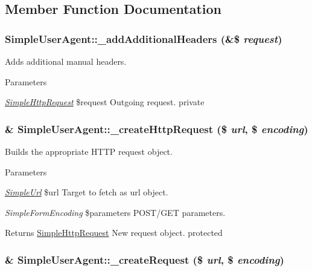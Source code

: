 \subsection{Member Function Documentation}
\hypertarget{class_simple_user_agent_a1ff4d1b6d409818bee5df07bc21c550f}{
\subsubsection[{\_\-addAdditionalHeaders}]{\setlength{\rightskip}{0pt plus 5cm}SimpleUserAgent::\_\-addAdditionalHeaders (\&\$ {\em request})}}
\label{class_simple_user_agent_a1ff4d1b6d409818bee5df07bc21c550f}
Adds additional manual headers. 
\begin{DoxyParams}{Parameters}
\item[{\em \hyperlink{class_simple_http_request}{SimpleHttpRequest}}]\$request Outgoing request.  private \end{DoxyParams}
\hypertarget{class_simple_user_agent_a1232e794f352b5f6b300899992277fb0}{
\subsubsection[{\_\-createHttpRequest}]{\setlength{\rightskip}{0pt plus 5cm}\& SimpleUserAgent::\_\-createHttpRequest (\$ {\em url}, \/  \$ {\em encoding})}}
\label{class_simple_user_agent_a1232e794f352b5f6b300899992277fb0}
Builds the appropriate HTTP request object. 
\begin{DoxyParams}{Parameters}
\item[{\em \hyperlink{class_simple_url}{SimpleUrl}}]\$url Target to fetch as url object. \item[{\em SimpleFormEncoding}]\$parameters POST/GET parameters. \end{DoxyParams}
\begin{DoxyReturn}{Returns}
\hyperlink{class_simple_http_request}{SimpleHttpRequest} New request object.  protected 
\end{DoxyReturn}
\hypertarget{class_simple_user_agent_ac399bd23f974ae0c5633c5240beb4278}{
\subsubsection[{\_\-createRequest}]{\setlength{\rightskip}{0pt plus 5cm}\& SimpleUserAgent::\_\-createRequest (\$ {\em url}, \/  \$ {\em encoding})}}
